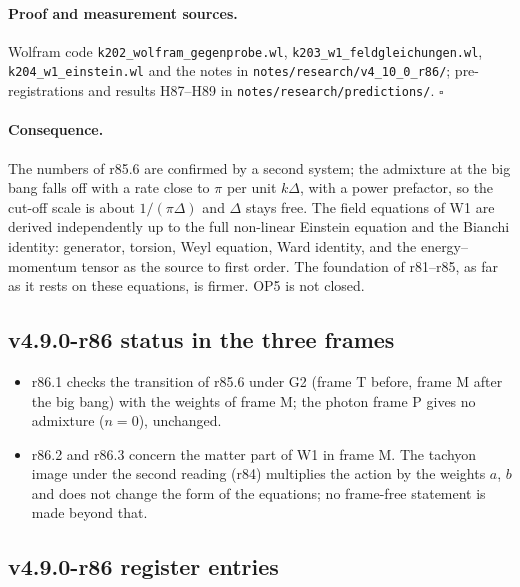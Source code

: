 \paragraph{Proof and measurement sources.}
Wolfram code \texttt{k202\_\allowbreak wolfram\_\allowbreak gegenprobe.wl}, \texttt{k203\_\allowbreak w1\_\allowbreak feldgleichungen.wl},
\texttt{k204\_\allowbreak w1\_\allowbreak einstein.wl} and the notes in \texttt{notes/\allowbreak research/\allowbreak v4\_10\_0\_r86/}; pre-registrations and
results H87--H89 in \texttt{notes/\allowbreak research/\allowbreak predictions/}.  \(\square\)

\paragraph{Consequence.}
The numbers of r85.6 are confirmed by a second system; the admixture at the big bang falls off with a rate close to \(\pi\) per unit
\(k\Delta\), with a power prefactor, so the cut-off scale is about \(1/(\pi\Delta)\) and \(\Delta\) stays free.  The field equations of W1 are derived
independently up to the full non-linear Einstein equation and the Bianchi identity: generator, torsion, Weyl equation, Ward identity, and
the energy--momentum tensor as the source to first order.  The foundation of r81--r85, as far as it rests on these equations, is firmer.
OP5 is not closed.

\subsection*{v4.9.0-r86 status in the three frames}
\label{subsec:v490-r86-frames}

\begin{itemize}[leftmargin=2em]
\item r86.1 checks the transition of r85.6 under G2 (frame T before, frame M after the big bang) with the weights of frame M; the photon frame P
gives no admixture (\(n=0\)), unchanged.
\item r86.2 and r86.3 concern the matter part of W1 in frame M.  The tachyon image under the second reading (r84) multiplies the action by the
weights \(a\), \(b\) and does not change the form of the equations; no frame-free statement is made beyond that.
\end{itemize}

\subsection*{v4.9.0-r86 register entries}
\label{subsec:v490-r86-register}


